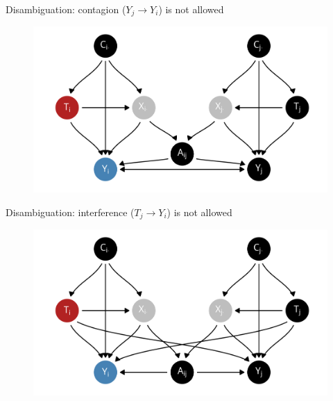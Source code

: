 \documentclass[aspectratio=169]{beamer}
\theoremstyle{remark}
\begin{document}
\appendix

\begin{frame}{Disambiguation: contagion ($Y_j \to Y_i$) is not allowed}

    \centering

    \begin{figure}
        \includegraphics[scale=0.7]{figures/dags/homophily-mediating-contagion-peer.png}
        \label{fig:contagion}
    \end{figure}

\end{frame}

\begin{frame}{Disambiguation: interference ($T_j \to Y_i$) is not allowed}

    \centering

    \begin{figure}
        \includegraphics[scale=0.7]{figures/dags/homophily-mediating-interference-peer.png}
        \label{fig:interference}
    \end{figure}

\end{frame}
\end{document}
